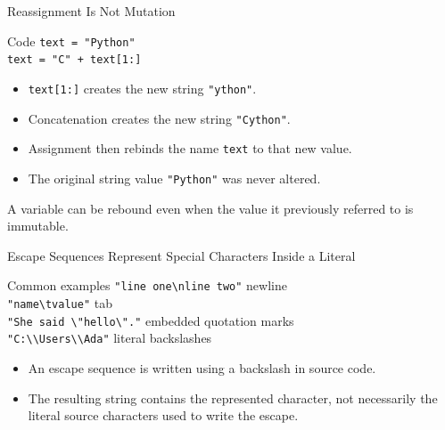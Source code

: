 \documentclass[aspectratio=169,10pt]{beamer}
\begin{document}
\begin{frame}{Reassignment Is Not Mutation}
  \begin{block}{Code}
    \texttt{text = "Python"}\\
    \texttt{text = "C" + text[1:]}
  \end{block}

  \begin{itemize}
    \item \texttt{text[1:]} creates the new string \texttt{"ython"}.
    \item Concatenation creates the new string \texttt{"Cython"}.
    \item Assignment then rebinds the name \texttt{text} to that new value.
    \item The original string value \texttt{"Python"} was never altered.
  \end{itemize}

  \begin{keyidea}
    A variable can be rebound even when the value it previously referred to is immutable.
  \end{keyidea}
\end{frame}


\begin{frame}{Escape Sequences Represent Special Characters Inside a Literal}
  \begin{block}{Common examples}
    \texttt{"line one\textbackslash nline two"} \quad newline\\
    \texttt{"name\textbackslash tvalue"} \quad tab\\
    \texttt{"She said \textbackslash"hello\textbackslash"."} \quad embedded quotation marks\\
    \texttt{"C:\textbackslash\textbackslash Users\textbackslash\textbackslash Ada"} \quad literal backslashes
  \end{block}

  \begin{itemize}
    \item An escape sequence is written using a backslash in source code.
    \item The resulting string contains the represented character, not necessarily the literal source characters used to write the escape.
  \end{itemize}
\end{frame}

\end{document}
